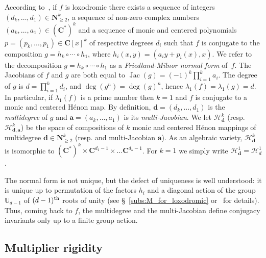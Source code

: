 \documentclass[oneside, 12pt]{amsart}
\DeclareMathOperator{\jac}{Jac}
\newcommand{\C}{\mathbf{C}}
\newcommand{\N}{\mathbf{N}}
\theoremstyle{plain}
\theoremstyle{definition}
\numberwithin{equation}{section}       %
\numberwithin{equation}{section}       %
\begin{document}
According to~\cite{friedland-milnor}, if $f$ is loxodromic there exists  a sequence of integers $(d_k, \ldots , d_1)\in \N_{\geq 2}^k$, a sequence of non-zero complex numbers 
$(a_k, \ldots , a_1)\in (\C^*)^k$ and a sequence of monic and centered polynomials 
$p=(p_k, \ldots , p_1)\in \C[x]^k$ of respective degrees $d_i$ such that $f$ is conjugate to the composition   
$g = h_k\circ \cdots \circ h_1$,
 where %
 $h_i(x,y) = (a_iy+p_i(x), x)$. We refer to the decomposition $g=h_k\circ \cdots \circ h_1$ as a \emph{Friedland-Milnor normal form} of~$f$. 
The Jacobians of $f$ and  $g$ are both equal to $\jac(g) = (-1)^k \prod_{i=1}^k a_i$.  
The degree of $g$ is   $d=\prod_{i=1}^k d_i$, and $\deg(g^n)=\deg(g)^n$, hence $\lambda_1(f)=\lambda_1(g)=d$. 
In particular, if  $\lambda_1(f)$ is a prime number then $k=1$ and  $f$ 
is conjugate to a monic and centered Hénon map.
By definition, 
$\mathbf d = (d_k, \ldots , d_1)$ is the \emph{multidegree} of %
$g$ and $\mathbf a=(a_k, \ldots , a_1)$ is its \emph{multi-Jacobian}.  
We let    $\mathcal H^k_{\mathbf d}$ 
  (resp. $\mathcal H^k_{\mathbf d,\mathbf a}$)
   be the space of    compositions of $k$ monic and centered  Hénon mappings of  
  multidegree $\mathbf d\in \N_{\geq 2}^k$ (resp. and   multi-Jacobian $\mathbf a$). 
As an algebraic variety, $\mathcal H^k_{\mathbf d}$ is isomorphic to $(\C^*)^k\times \C^{d_1-1}\times \ldots \C^{d_k-1}$.    For $k=1$ we   
simply write $\mathcal H^1_{\mathbf d} = \mathcal H^1_d$.

The normal form is not unique, but the defect of uniqueness is well understood: it is unique up to permutation of the factors $h_i$ and a diagonal action of the group 
$\mathbb{U}_{d-1}$ of $(d-1)^{\rm th}$ 
roots of unity (see \S~\ref{subs:M_for_loxodromic} or~\cite{friedland-milnor} for details). 
Thus, coming back to $f$,  
the multidegree and the multi-Jacobian define  conjugacy invariants only up to a finite group action. 

\subsection{Multiplier rigidity}\label{par:into_multiplier_rigidity}
\end{document}
